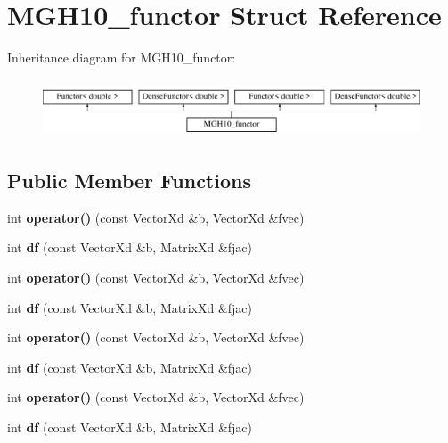 \hypertarget{struct_m_g_h10__functor}{}\section{M\+G\+H10\+\_\+functor Struct Reference}
\label{struct_m_g_h10__functor}
Inheritance diagram for M\+G\+H10\+\_\+functor\+:\begin{figure}[H]
\begin{center}
\leavevmode
\includegraphics[height=1.728395cm]{struct_m_g_h10__functor}
\end{center}
\end{figure}
\subsection*{Public Member Functions}
\begin{DoxyCompactItemize}
\item 
\mbox{\label{struct_m_g_h10__functor_ad9f6aa70acf98c42941719f02ca25611}} 
int {\bfseries operator()} (const Vector\+Xd \&b, Vector\+Xd \&fvec)
\item 
\mbox{\label{struct_m_g_h10__functor_af49e55daa043732fdadf03f1508e52fa}} 
int {\bfseries df} (const Vector\+Xd \&b, Matrix\+Xd \&fjac)
\item 
\mbox{\label{struct_m_g_h10__functor_ad9f6aa70acf98c42941719f02ca25611}} 
int {\bfseries operator()} (const Vector\+Xd \&b, Vector\+Xd \&fvec)
\item 
\mbox{\label{struct_m_g_h10__functor_af49e55daa043732fdadf03f1508e52fa}} 
int {\bfseries df} (const Vector\+Xd \&b, Matrix\+Xd \&fjac)
\item 
\mbox{\label{struct_m_g_h10__functor_ad9f6aa70acf98c42941719f02ca25611}} 
int {\bfseries operator()} (const Vector\+Xd \&b, Vector\+Xd \&fvec)
\item 
\mbox{\label{struct_m_g_h10__functor_af49e55daa043732fdadf03f1508e52fa}} 
int {\bfseries df} (const Vector\+Xd \&b, Matrix\+Xd \&fjac)
\item 
\mbox{\label{struct_m_g_h10__functor_ad9f6aa70acf98c42941719f02ca25611}} 
int {\bfseries operator()} (const Vector\+Xd \&b, Vector\+Xd \&fvec)
\item 
\mbox{\label{struct_m_g_h10__functor_af49e55daa043732fdadf03f1508e52fa}} 
int {\bfseries df} (const Vector\+Xd \&b, Matrix\+Xd \&fjac)
\end{DoxyCompactItemize}
